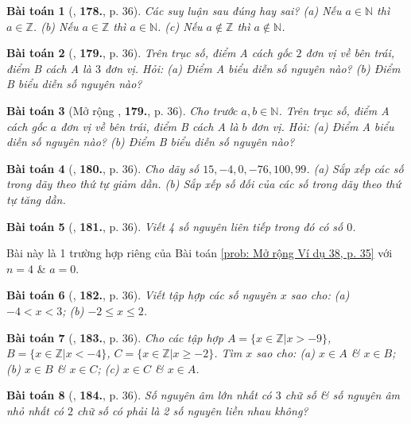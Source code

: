 \documentclass{article}
\numberwithin{equation}{section}
\newtheorem{baitoan}{Bài toán}
\begin{document}
\begin{baitoan}[\cite{Tuyen_Toan_6}, \textbf{178.}, p. 36]
	Các suy luận sau đúng hay sai? (a) Nếu $a\in\mathbb{N}$ thì $a\in\mathbb{Z}$. (b) Nếu $a\in\mathbb{Z}$ thì $a\in\mathbb{N}$. (c) Nếu $a\notin\mathbb{Z}$ thì $a\notin\mathbb{N}$.
\end{baitoan}

\begin{baitoan}[\cite{Tuyen_Toan_6}, \textbf{179.}, p. 36]
	Trên trục số, điểm A cách gốc $2$ đơn vị về bên trái, điểm B cách A là $3$ đơn vị. Hỏi: (a) Điểm A biểu diễn số nguyên nào? (b) Điểm B biểu diễn số nguyên nào?
\end{baitoan}

\begin{baitoan}[Mở rộng \cite{Tuyen_Toan_6}, \textbf{179.}, p. 36]
	Cho trước $a,b\in\mathbb{N}$. Trên trục số, điểm A cách gốc $a$ đơn vị về bên trái, điểm B cách A là $b$ đơn vị. Hỏi: (a) Điểm A biểu diễn số nguyên nào? (b) Điểm B biểu diễn số nguyên nào?
\end{baitoan}

\begin{baitoan}[\cite{Tuyen_Toan_6}, \textbf{180.}, p. 36]
	Cho dãy số $15,-4,0,-76,100,99$. (a) Sắp xếp các số trong dãy theo thứ tự giảm dần. (b) Sắp xếp số đối của các số trong dãy theo thứ tự tăng dần.
\end{baitoan}

\begin{baitoan}[\cite{Tuyen_Toan_6}, \textbf{181.}, p. 36]
	Viết 4 số nguyên liên tiếp trong đó có số $0$.
\end{baitoan}
Bài này là 1 trường hợp riêng của Bài toán \ref{prob: Mở rộng Ví dụ 38, p. 35} với $n = 4$ \& $a = 0$.

\begin{baitoan}[\cite{Tuyen_Toan_6}, \textbf{182.}, p. 36]
	Viết tập hợp các số nguyên $x$ sao cho: (a) $-4 < x < 3$; (b) $-2\le x\le 2$.
\end{baitoan}

\begin{baitoan}[\cite{Tuyen_Toan_6}, \textbf{183.}, p. 36]
	Cho các tập hợp $A = \{x\in\mathbb{Z}|x > -9\}$, $B = \{x\in\mathbb{Z}|x < -4\}$, $C = \{x\in\mathbb{Z}|x\ge-2\}$. Tìm $x$ sao cho: (a) $x\in A$ \& $x\in B$; (b) $x\in B$ \& $x\in C$; (c) $x\in C$ \& $x\in A$.
\end{baitoan}

\begin{baitoan}[\cite{Tuyen_Toan_6}, \textbf{184.}, p. 36]
	Số nguyên âm lớn nhất có $3$ chữ số \& số nguyên âm nhỏ nhất có $2$ chữ số có phải là 2 số nguyên liền nhau không?
\end{baitoan}
\end{document}
